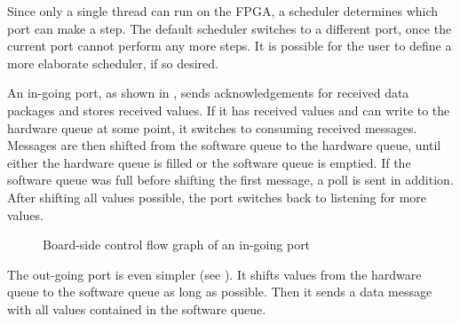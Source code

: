 \documentclass{report}
\begin{document}
Since only a single thread can run on the FPGA, a scheduler determines which port can make a step. The default scheduler switches to a different port, once the current port cannot perform any more steps. It is possible for the user to define a more elaborate scheduler, if so desired.

An in-going port, as shown in , sends acknowledgements for received data packages and stores received values. If it has received values and can write to the hardware queue at some point, it switches to consuming received messages. Messages are then shifted from the software queue to the hardware queue, until either the hardware queue is filled or the software queue is emptied. If the software queue was full before shifting the first message, a poll is sent in addition. After shifting all values possible, the port switches back to listening for more values. 

\begin{figure}[h]
\centering
{}
\label{fig:cfg:boardIn}
\caption{Board-side control flow graph of an in-going port}
\end{figure}

\newpage
The out-going port is even simpler (see ). It shifts values from the hardware queue to the software queue as long as possible. Then it sends a data message with all values contained in the software queue.
\end{document}
